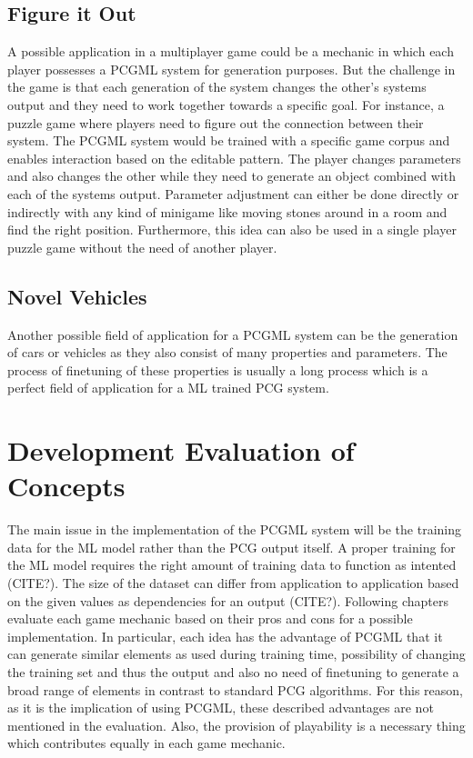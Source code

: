 \documentclass[MGS,Master,english]{twbook}%
\begin{document}
\subsection{Figure it Out} \label{idea::figureItOut}
A possible application in a multiplayer game could be a mechanic in which each player possesses a PCGML system for generation purposes. But the challenge in the game is that each generation of the system changes the other's systems output and they need to work together towards a specific goal. For instance, a puzzle game where players need to figure out the connection between their system. The PCGML system would be trained with a specific game corpus and enables interaction based on the editable pattern. The player changes parameters and also changes the other while they need to generate an object combined with each of the systems output. Parameter adjustment can either be done directly or indirectly with any kind of minigame like moving stones around in a room and find the right position. Furthermore, this idea can also be used in a single player puzzle game without the need of another player.

\subsection{Novel Vehicles} \label{idea::novelCars}
Another possible field of application for a PCGML system can be the generation of cars or vehicles as they also consist of many properties and parameters. The process of finetuning of these properties is usually a long process which is a perfect field of application for a ML trained PCG system.

\section{Development Evaluation of Concepts}
The main issue in the implementation of the PCGML system will be the training data for the ML model rather than the PCG output itself. A proper training for the ML model requires the right amount of training data to function as intented (CITE?). The size of the dataset can differ from application to application based on the given values as dependencies for an output (CITE?). Following chapters evaluate each game mechanic based on their pros and cons for a possible implementation. In particular, each idea has the advantage of PCGML that it can generate similar elements as used during training time, possibility of changing the training set and thus the output and also no need of finetuning to generate a broad range of elements in contrast to standard PCG algorithms. For this reason, as it is the implication of using PCGML, these described advantages are not mentioned in the evaluation. Also, the provision of playability is a necessary thing which contributes equally in each game mechanic.
\end{document}

